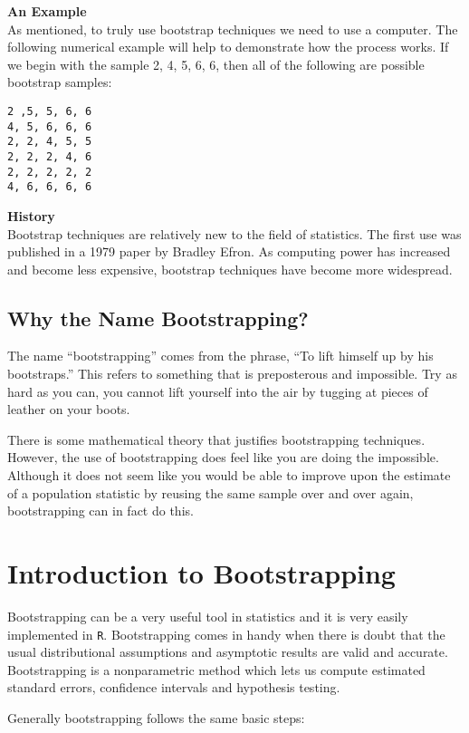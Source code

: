 \documentclass[12pt]{article}
\begin{document}
\textbf{An Example}\\
As mentioned, to truly use bootstrap techniques we need to use a computer. The following numerical example will help to demonstrate how the process works. If we begin with the sample 2, 4, 5, 6, 6, then all of the following are possible bootstrap samples:

\begin{verbatim}
2 ,5, 5, 6, 6
4, 5, 6, 6, 6
2, 2, 4, 5, 5
2, 2, 2, 4, 6
2, 2, 2, 2, 2
4, 6, 6, 6, 6
\end{verbatim}
\textbf{History}\\
Bootstrap techniques are relatively new to the field of statistics. The first use was published in a 1979 paper by Bradley Efron. As computing power has increased and become less expensive, bootstrap techniques have become more widespread.

\subsection*{Why the Name Bootstrapping?}

The name “bootstrapping” comes from the phrase, “To lift himself up by his bootstraps.” This refers to something that is preposterous and impossible. Try as hard as you can, you cannot lift yourself into the air by tugging at pieces of leather on your boots.

There is some mathematical theory that justifies bootstrapping techniques. However, the use of bootstrapping does feel like you are doing the impossible. Although it does not seem like you would be able to improve upon the estimate of a population statistic by reusing the same sample over and over again, bootstrapping can in fact do this.
\newpage
\section*{Introduction to 
Bootstrapping}

Bootstrapping can be a very useful tool in statistics and it is very easily implemented in \texttt{R}. Bootstrapping comes in handy when there is doubt that the usual distributional assumptions and asymptotic results are valid and accurate. Bootstrapping is a nonparametric method which lets us compute estimated standard errors, confidence intervals and hypothesis testing.

Generally bootstrapping follows the same basic steps:
\end{document}
